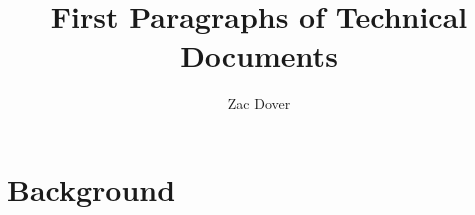 \documentclass{article}
\title{First Paragraphs of Technical Documents}
\author{Zac Dover}
\begin{document}
\maketitle

\section{Background}
\end{document}
